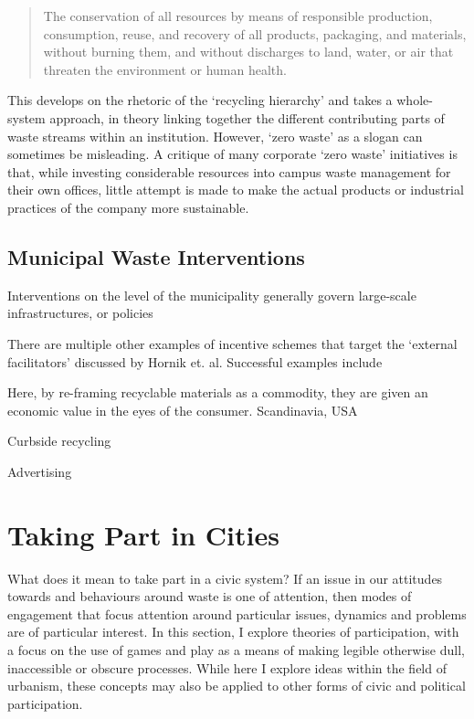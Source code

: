 \documentclass[nofonts,nols,justified,nobib]{tufte-book}
\begin{document}
\begin{quote}
The conservation of all resources by means of responsible production, consumption, reuse, and recovery of all products, packaging, and materials, without burning them, and without discharges to land, water, or air that threaten the environment or human health. 
\cite{zero_waste_international_alliance_zero_2017}
\end{quote}

This develops on the rhetoric of the `recycling hierarchy' and takes a whole-system approach, in theory linking together the different contributing parts of waste streams within an institution. However, `zero waste' as a slogan can sometimes be misleading. A critique of many corporate `zero waste' initiatives is that, while investing considerable resources into campus waste management for their own offices, little attempt is made to make the actual products or industrial practices of the company more sustainable.

\subsection*{Municipal Waste Interventions}
Interventions on the level of the municipality generally govern large-scale infrastructures, or policies 

There are multiple other examples of incentive schemes that target the `external facilitators' discussed by Hornik et. al. Successful examples include 

Here, by re-framing recyclable materials as a commodity, they are given an economic value in the eyes of the consumer. Scandinavia, USA

Curbside recycling

Advertising

\section*{Taking Part in Cities}
What does it mean to take part in a civic system? If an issue in our attitudes towards and behaviours around waste is one of attention, then modes of engagement that focus attention around particular issues, dynamics and problems are of particular interest. In this section, I explore theories of participation, with a focus on the use of games and play as a means of making legible otherwise dull, inaccessible or obscure processes. While here I explore ideas within the field of urbanism, these concepts may also be applied to other forms of civic and political participation.
\end{document}
